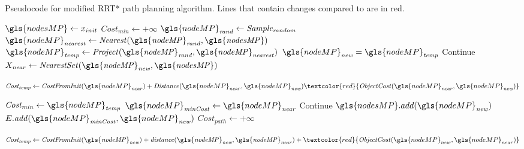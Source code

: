 \begin{algorithm}[H]
  \caption{Pseudocode for modified \ac{RRT*} path planning algorithm. Lines that contain changes compared to  are in red.}%
  \label{pseudocode:modified_proposed_rrt_star}
  \begin{algorithmic}[1]

    \State $\gls{nodesMP} \leftarrow x_{init}$
      \State $Cost_\mathit{min} \leftarrow +\infty$ 
      \State $\gls{nodeMP}_\mathit{rand} \leftarrow \mathit{Sample_{random}}$
      \State $\gls{nodeMP}_\mathit{nearest} \leftarrow \mathit{Nearest(\gls{nodeMP}_{rand}, \gls{nodesMP})}$
      \State $\gls{nodeMP}_\mathit{temp} \leftarrow \mathit{Project(\gls{nodeMP}_{rand}, \gls{nodeMP}_{nearest})}$
      \State $\gls{nodeMP}_\mathit{new} = \gls{nodeMP}_\mathit{temp}$
      \Else
      \State Continue
      \EndIf
      \State $X_\mathit{near} \leftarrow \mathit{NearestSet(\gls{nodeMP}_{new}, \gls{nodesMP})}$ 

    \State $\mathit{Cost_{temp}} \leftarrow \mathit{CostFromInit}(\gls{nodeMP}_\mathit{near}) + \mathit{Distance}(\gls{nodeMP}_\mathit{near}, \gls{nodeMP}_\mathit{new})
\textcolor{red}{\mathit{ObjectCost}(\gls{nodeMP}_\mathit{near}, \gls{nodeMP}_\mathit{new})}$

      \State $\mathit{Cost_{min}} \leftarrow \gls{nodeMP}_\mathit{temp}$
      \State $\gls{nodeMP}_\mathit{minCost} \leftarrow \gls{nodeMP}_\mathit{near}$
      \EndIf
      \EndFor
      \State Continue
      \Else
      \State $\gls{nodesMP}.add(\gls{nodeMP}_\mathit{new})$
      \State $E.\mathit{add}(\gls{nodeMP}_\mathit{minCost}, \gls{nodeMP}_\mathit{new})$
      \EndIf
      \State $\mathit{Cost_{path}} \leftarrow +\infty$ 

      \State $\mathit{Cost_{temp}} \leftarrow \mathit{CostFromInit(\gls{nodeMP}_{new})} + \mathit{distance(\gls{nodeMP}_{new}, \gls{nodeMP}_{near})} +\textcolor{red}{\mathit{ObjectCost}(\gls{nodeMP}_{new}, \gls{nodeMP}_{near})}$


\end{algorithmic}
\end{algorithm}
